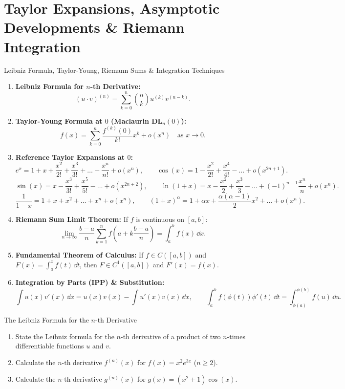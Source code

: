 \chapter{Taylor Expansions, Asymptotic Developments \& Riemann Integration}
\label{chap:exo_ch06}

\begin{quicksummary}{Leibniz Formula, Taylor-Young, Riemann Sums \& Integration Techniques}
\begin{enumerate}[leftmargin=1.4em,itemsep=3pt]
  \item \textbf{Leibniz Formula for $n$-th Derivative:}
  \[
  (u \cdot v)^{(n)} = \sum_{k=0}^n \binom{n}{k} u^{(k)} v^{(n-k)}.
  \]
  \item \textbf{Taylor-Young Formula at $0$ (Maclaurin DL$_n(0)$):}
  \[
  f(x) = \sum_{k=0}^n \frac{f^{(k)}(0)}{k!} x^k + o(x^n) \quad \text{as } x \to 0.
  \]
  \item \textbf{Reference Taylor Expansions at $0$:}
  \[
  e^x = 1 + x + \frac{x^2}{2!} + \frac{x^3}{3!} + \dots + \frac{x^n}{n!} + o(x^n), \qquad \cos(x) = 1 - \frac{x^2}{2!} + \frac{x^4}{4!} - \dots + o(x^{2n+1}).
  \]
  \[
  \sin(x) = x - \frac{x^3}{3!} + \frac{x^5}{5!} - \dots + o(x^{2n+2}), \qquad \ln(1 + x) = x - \frac{x^2}{2} + \frac{x^3}{3} - \dots + (-1)^{n-1}\frac{x^n}{n} + o(x^n).
  \]
  \[
  \frac{1}{1 - x} = 1 + x + x^2 + \dots + x^n + o(x^n), \qquad (1 + x)^\alpha = 1 + \alpha x + \frac{\alpha(\alpha-1)}{2} x^2 + \dots + o(x^n).
  \]
  \item \textbf{Riemann Sum Limit Theorem:}
  If $f$ is continuous on $[a, b]$:
  \[
  \lim_{n \to \infty} \frac{b - a}{n} \sum_{k=1}^n f\left(a + k\frac{b - a}{n}\right) = \int_a^b f(x)\,\dd x.
  \]
  \item \textbf{Fundamental Theorem of Calculus:}
  If $f \in C([a, b])$ and $F(x) = \int_a^x f(t)\,\dd t$, then $F \in C^1([a, b])$ and $F'(x) = f(x)$.
  \item \textbf{Integration by Parts (IPP) \& Substitution:}
  \[
  \int u(x) v'(x)\,\dd x = u(x) v(x) - \int u'(x) v(x)\,\dd x, \qquad \int_a^b f(\phi(t))\phi'(t)\,\dd t = \int_{\phi(a)}^{\phi(b)} f(u)\,\dd u.
  \]
\end{enumerate}
\end{quicksummary}

\vspace{10pt}

\begin{exercise}{The Leibniz Formula for the $n$-th Derivative}
\begin{enumerate}[leftmargin=1.5em,itemsep=2pt]
  \item State the Leibniz formula for the $n$-th derivative of a product of two $n$-times differentiable functions $u$ and $v$.
  \item Calculate the $n$-th derivative $f^{(n)}(x)$ for $f(x) = x^2 e^{3x}$ ($n \ge 2$).
  \item Calculate the $n$-th derivative $g^{(n)}(x)$ for $g(x) = (x^2 + 1) \cos(x)$.
\end{enumerate}
\end{exercise}

